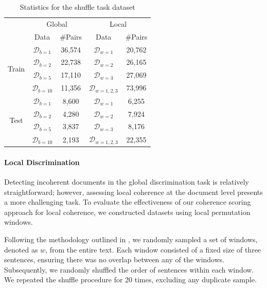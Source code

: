 \documentclass[letterpaper]{article}
\begin{document}
\begin{table}[t!]
  \centering
  \small
  \begin{tabular}{@{}ccc|cc}
    \toprule
    & \multicolumn{2}{c|}{Global} & \multicolumn{2}{c}{Local} \\
    \cmidrule(lr){2-3} \cmidrule(lr){4-5}
    & Data & \#Pairs & Data & \#Pairs \\
    \midrule
    \multirow{4}{*}{Train} & $\mathcal{D}_{b=1}$ &  36,574 & $\mathcal{D}_{w=1}$  &20,762 \\
    & $\mathcal{D}_{b=2}$ & 22,738  & $\mathcal{D}_{w=2}$ &26,165  \\
    & $\mathcal{D}_{b=5}$ & 17,110 & $\mathcal{D}_{w=3}$ &27,069 \\
    & $\mathcal{D}_{b=10}$ & 11,356 & $\mathcal{D}_{w=1,2,3}$ &73,996 \\
    \midrule
    \multirow{4}{*}{Test} & $\mathcal{D}_{b=1}$ &8,600 & $\mathcal{D}_{w=1}$  &6,255 \\
    & $\mathcal{D}_{b=2}$ &4,280 & $\mathcal{D}_{w=2}$  &7,924 \\
    & $\mathcal{D}_{b=5}$ &  3,837 & $\mathcal{D}_{w=3}$ &8,176 \\
    & $\mathcal{D}_{b=10}$ & 2,193 & $\mathcal{D}_{w=1,2,3}$  &22,355 \\
    \bottomrule
  \end{tabular}
  \caption{Statistics for the shuffle task dataset}
  \label{datastat}
\end{table}

\paragraph{Local Discrimination}\label{exp:local} Detecting incoherent documents in the global discrimination task is relatively straightforward; however, assessing local coherence at the document level presents a more challenging task. To evaluate the effectiveness of our coherence scoring approach for local coherence, we constructed datasets using local permutation windows.

Following the methodology outlined in \citet{moon-etal-2019-unified}, we randomly sampled a set of windows, denoted as $w$, from the entire text. Each window consisted of a fixed size of three sentences, ensuring there was no overlap between any of the windows. Subsequently, we randomly shuffled the order of sentences within each window. We repeated the shuffle procedure for 20 times, excluding any duplicate sample.
\end{document}
